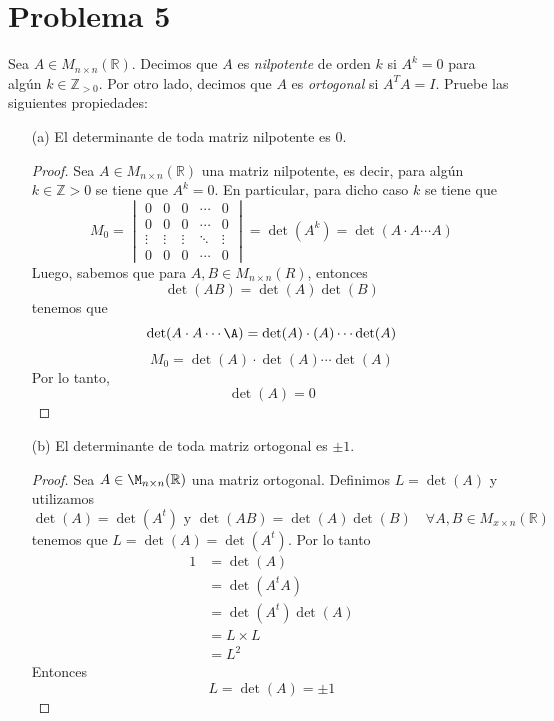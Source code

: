 \documentclass[11pt]{article}
\theoremstyle{definition} %
\newcommand{\R}{\mathbb{R}}
\newcommand{\Z}{\mathbb{Z}}
\begin{document}
\section*{Problema 5}
Sea \(A\in M_{n\times n}(\R)\). Decimos que \(A\) es \emph{nilpotente} de orden \(k\) si \(A^k=0\) para algún \(k\in\Z_{>0}\). Por otro lado, decimos que \(A\) es \emph{ortogonal} si \(A^{T}A=I\). Pruebe las siguientes propiedades:
\begin{enumerate}
  \item[(a)] El determinante de toda matriz nilpotente es \(0\).
    \begin{proof}
      Sea $A \in M_{n\times n}(\R)$ una matriz nilpotente, es decir, para algún $k \in \Z > 0$ se tiene que $A^k=0$. En particular, para dicho caso $k$ se tiene que 
      \[
          M_0 =   \begin{vmatrix}
          0 & 0 & 0 & \cdots & 0\\[4pt]
          0 & 0 & 0 & \cdots & 0\\[4pt]
          \vdots & \vdots & \vdots & \ddots & \vdots\\[4pt]
          0 & 0 & 0 & \cdots & 0
          \end{vmatrix} = \det(A^k)=\det (A\cdot A \cdots A)
      \]
      Luego, sabemos que para $A,B \in M_{n\times n}(R)$, entonces 
      \[
        \det (AB)=\det (A) \det (B)
      \]
      tenemos que 
      \[
        \det (A\cdot A\cdots \A)= \det (A) \cdot (A) \cdots \det (A) 
      \]
      \[
        M_0 = \det(A) \cdot \det (A) \cdots \det (A)
      \]  
      Por lo tanto, 
      \[
        \det (A) = 0
      \]
    \end{proof}
  \item[(b)] El determinante de toda matriz ortogonal es \(\pm 1\).
  \begin{proof}
    Sea $A\in \M_{n\times n}(\R)$ una matriz ortogonal. Definimos $L = \det (A)$ y utilizamos
    \[
      \det (A)= \det (A^t) \text{ y } \det(AB)=\det (A) \det (B) \quad \forall A,B\in M_{x \times n}(\R) 
    \]
    tenemos que $L = \det (A)= \det (A^t)$. Por lo tanto
    \begin{align*}
      1 &= \det (A) \\
      & = \det (A^t A) \\
      &= \det (A^t)\det (A)\\
      &= L \times L \\
      &= L^2
    \end{align*}
    Entonces
    \[
      L=\det(A)=\pm 1
    \]
  \end{proof}
\end{enumerate}
\end{document}

